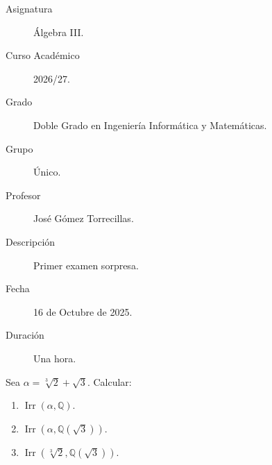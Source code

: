 \documentclass[12pt]{article}
\DeclareMathOperator{\Irr}{Irr}
\begin{document}

    
    

    \begin{description}
        \item[Asignatura] Álgebra III.
        \item[Curso Académico] 2026/27.
        \item[Grado] Doble Grado en Ingeniería Informática y Matemáticas.
        \item[Grupo] Único.
        \item[Profesor] José Gómez Torrecillas.
        \item[Descripción] Primer examen sorpresa.
        \item[Fecha] 16 de Octubre de 2025.
        \item[Duración] Una hora.
    
    \end{description}
    \newpage




\begin{ejercicio}
    Sea $\alpha=\sqrt[3]{2}+\sqrt{3}$. Calcular:
    \begin{enumerate}
        \item $\Irr(\alpha,\mathbb{Q})$.
        \item $\Irr(\alpha,\mathbb{Q}(\sqrt{3}))$.
        \item $\Irr(\sqrt[3]{2},\mathbb{Q}(\sqrt{3}))$.
    \end{enumerate}
\end{ejercicio}


\setcounter{ejercicio}{0}
\newpage
\end{document}
